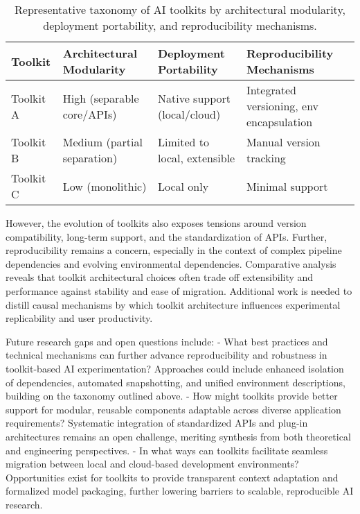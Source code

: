 \documentclass[sigconf]{acmart}
\begin{document}
\begin{table*}[htbp]
\centering
\caption{Representative taxonomy of AI toolkits by architectural modularity, deployment portability, and reproducibility mechanisms.}
\label{tab:toolkit-taxonomy}
\begin{adjustbox}{max width=\textwidth}
\begin{tabular}{@{}llll@{}}
\toprule
\textbf{Toolkit} & \textbf{Architectural Modularity} & \textbf{Deployment Portability} & \textbf{Reproducibility Mechanisms} \\
\midrule
Toolkit A & High (separable core/APIs) & Native support (local/cloud) & Integrated versioning, env encapsulation \\
Toolkit B & Medium (partial separation) & Limited to local, extensible & Manual version tracking \\
Toolkit C & Low (monolithic) & Local only & Minimal support \\
\bottomrule
\end{tabular}
\end{adjustbox}
\end{table*}

However, the evolution of toolkits also exposes tensions around version compatibility, long-term support, and the standardization of APIs. Further, reproducibility remains a concern, especially in the context of complex pipeline dependencies and evolving environmental dependencies. Comparative analysis reveals that toolkit architectural choices often trade off extensibility and performance against stability and ease of migration. Additional work is needed to distill causal mechanisms by which toolkit architecture influences experimental replicability and user productivity.

Future research gaps and open questions include:
- What best practices and technical mechanisms can further advance reproducibility and robustness in toolkit-based AI experimentation? Approaches could include enhanced isolation of dependencies, automated snapshotting, and unified environment descriptions, building on the taxonomy outlined above.
- How might toolkits provide better support for modular, reusable components adaptable across diverse application requirements? Systematic integration of standardized APIs and plug-in architectures remains an open challenge, meriting synthesis from both theoretical and engineering perspectives.
- In what ways can toolkits facilitate seamless migration between local and cloud-based development environments? Opportunities exist for toolkits to provide transparent context adaptation and formalized model packaging, further lowering barriers to scalable, reproducible AI research.
\end{document}
